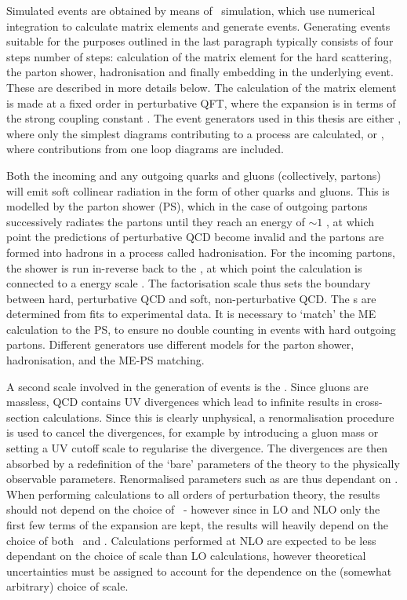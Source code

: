 Simulated events are obtained by
means of \mc\ simulation, which use numerical integration to calculate matrix
elements and generate events. Generating events suitable for the purposes
outlined in the last paragraph typically consists of four steps number of steps:
calculation of the matrix element for the hard scattering, the parton shower,
hadronisation and finally embedding in the underlying event. These are described
in more details below. The calculation of the matrix element is
made at a fixed order in perturbative QFT, where the expansion is in terms of
the strong coupling constant \alphaS. The event generators used in this thesis
are either , where only the simplest diagrams
contributing to a process are calculated, or ,
where contributions from one loop diagrams are included. 

Both the incoming and any outgoing quarks and gluons
(collectively, partons) will emit soft collinear radiation in the form of other quarks and gluons. This is
modelled by the parton shower (PS), which in the case of outgoing partons
successively radiates the partons until they reach an energy of $\sim 1$ \gev, at
which point the predictions of perturbative QCD become invalid and the partons
are formed into hadrons in a process called hadronisation. For the incoming partons, the
shower is run in-reverse back to the , at which
point the calculation is connected to a  energy scale \uF. The
factorisation scale thus sets the boundary between hard, perturbative QCD and
soft, non-perturbative QCD. The \partDF s are determined from fits to
experimental data. It is necessary to `match' the
ME calculation to the PS, to ensure no double counting in events with hard
outgoing partons. Different generators use different models for the parton
shower, hadronisation, and the ME-PS matching.

A second scale involved in the generation of events is the
. Since gluons are massless, QCD contains UV
divergences which lead to infinite results in cross-section calculations. Since 
this is clearly unphysical, a renormalisation procedure is used to cancel the
divergences, for example by introducing a gluon mass or setting a UV cutoff
scale to regularise the divergence. The divergences are then absorbed by a
redefinition of the `bare' parameters of the theory to the physically observable
parameters. Renormalised parameters such as \alphaS are thus dependant on \uR.
When performing calculations to all orders of perturbation theory,  the results
should not depend on the choice of \uR\ - however since in LO and NLO only the
first few terms of the expansion are kept, the results will heavily depend on
the choice of both \uR\ and \uF. Calculations performed at NLO are expected to
be less dependant on the choice of scale than LO calculations, however
theoretical uncertainties must be assigned to account for the dependence on the
(somewhat arbitrary) choice of scale.

